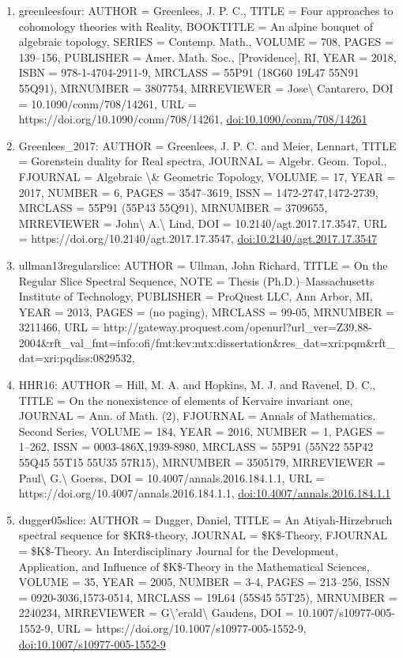 \documentclass[11pt]{article}
\begin{document}
\begin{enumerate}[leftmargin=*]
  \item greenleesfour: AUTHOR = Greenlees, J. P. C., TITLE = Four approaches to cohomology theories with Reality, BOOKTITLE = An alpine bouquet of algebraic topology, SERIES = Contemp. Math., VOLUME = 708, PAGES = 139--156, PUBLISHER = Amer. Math. Soc., [Providence], RI, YEAR = 2018, ISBN = 978-1-4704-2911-9, MRCLASS = 55P91 (18G60 19L47 55N91 55Q91), MRNUMBER = 3807754, MRREVIEWER = Jose\textbackslash{} Cantarero, DOI = 10.1090/conm/708/14261, URL = https://doi.org/10.1090/conm/708/14261, \href{https://doi.org/10.1090/conm/708/14261}{doi:10.1090/conm/708/14261}
  \item Greenlees\_2017: AUTHOR = Greenlees, J. P. C. and Meier, Lennart, TITLE = Gorenstein duality for Real spectra, JOURNAL = Algebr. Geom. Topol., FJOURNAL = Algebraic \textbackslash{}\& Geometric Topology, VOLUME = 17, YEAR = 2017, NUMBER = 6, PAGES = 3547--3619, ISSN = 1472-2747,1472-2739, MRCLASS = 55P91 (55P43 55Q91), MRNUMBER = 3709655, MRREVIEWER = John\textbackslash{} A.\textbackslash{} Lind, DOI = 10.2140/agt.2017.17.3547, URL = https://doi.org/10.2140/agt.2017.17.3547, \href{https://doi.org/10.2140/agt.2017.17.3547}{doi:10.2140/agt.2017.17.3547}
  \item ullman13regularslice: AUTHOR = Ullman, John Richard, TITLE = On the Regular Slice Spectral Sequence, NOTE = Thesis (Ph.D.)--Massachusetts Institute of Technology, PUBLISHER = ProQuest LLC, Ann Arbor, MI, YEAR = 2013, PAGES = (no paging), MRCLASS = 99-05, MRNUMBER = 3211466, URL = http://gateway.proquest.com/openurl?url\_ver=Z39.88-2004\&rft\_val\_fmt=info:ofi/fmt:kev:mtx:dissertation\&res\_dat=xri:pqm\&rft\_dat=xri:pqdiss:0829532,
  \item HHR16: AUTHOR = Hill, M. A. and Hopkins, M. J. and Ravenel, D. C., TITLE = On the nonexistence of elements of Kervaire invariant one, JOURNAL = Ann. of Math. (2), FJOURNAL = Annals of Mathematics. Second Series, VOLUME = 184, YEAR = 2016, NUMBER = 1, PAGES = 1--262, ISSN = 0003-486X,1939-8980, MRCLASS = 55P91 (55N22 55P42 55Q45 55T15 55U35 57R15), MRNUMBER = 3505179, MRREVIEWER = Paul\textbackslash{} G.\textbackslash{} Goerss, DOI = 10.4007/annals.2016.184.1.1, URL = https://doi.org/10.4007/annals.2016.184.1.1, \href{https://doi.org/10.4007/annals.2016.184.1.1}{doi:10.4007/annals.2016.184.1.1}
  \item dugger05slice: AUTHOR = Dugger, Daniel, TITLE = An Atiyah-Hirzebruch spectral sequence for \$KR\$-theory, JOURNAL = \$K\$-Theory, FJOURNAL = \$K\$-Theory. An Interdisciplinary Journal for the Development, Application, and Influence of \$K\$-Theory in the Mathematical Sciences, VOLUME = 35, YEAR = 2005, NUMBER = 3-4, PAGES = 213--256, ISSN = 0920-3036,1573-0514, MRCLASS = 19L64 (55S45 55T25), MRNUMBER = 2240234, MRREVIEWER = G\textbackslash{}'erald\textbackslash{} Gaudens, DOI = 10.1007/s10977-005-1552-9, URL = https://doi.org/10.1007/s10977-005-1552-9, \href{https://doi.org/10.1007/s10977-005-1552-9}{doi:10.1007/s10977-005-1552-9}

\end{enumerate}
\end{document}

